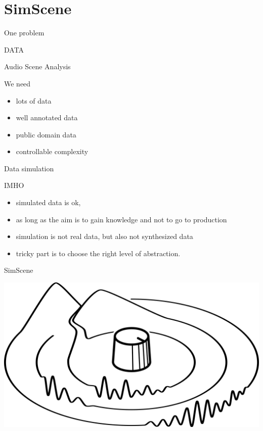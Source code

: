 \documentclass[compress]{beamer}
\begin{document}
\section{SimScene}

\begin{frame}{One problem}
\begin{center}
\huge DATA
\end{center}
\end{frame}


\begin{frame}{Audio Scene Analysis}
\begin{center}
\begin{block}{We need}
\begin{itemize}
\item lots of data
\item well annotated data
\item public domain data
\item controllable complexity
\end{itemize}
\end{block}
\end{center}
\end{frame}

\begin{frame}{Data simulation}
\begin{center}
\begin{block}{IMHO}
\begin{itemize}
\item simulated data is ok, 
\item as long as the aim is to gain knowledge and not to go to production
\item simulation is not real data, but also not synthesized data
\item tricky part is to choose the right level of abstraction.
\end{itemize}
\end{block}
\end{center}
\end{frame}

\begin{frame}{SimScene}
\begin{center}
\includegraphics[width=.6\columnwidth]{figures/simscene} \\
\end{center}
\end{frame}
\end{document}
